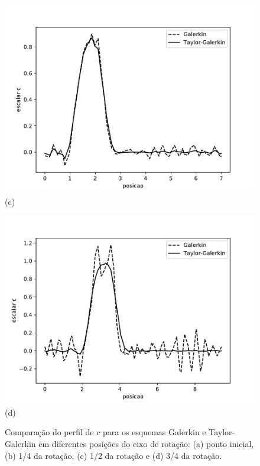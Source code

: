 \begin{center}
\begin{figure}[H]
\begin{minipage}{.5\linewidth}
      \centering
      \includegraphics[scale=0.53]{./02_chaps/cap_validation/figure/convection_600.pdf}\\
      (c)
     \end{minipage}%
     \begin{minipage}{.5\linewidth}
      \centering
      \includegraphics[scale=0.53]{./02_chaps/cap_validation/figure/convection_950.pdf}\\
      (d)
     \end{minipage}
     \medskip
     \caption{Comparação do perfil de $c$ para os esquemas Galerkin e Taylor-Galerkin em diferentes posições do eixo de rotação:
     (a) ponto inicial, 
     (b) 1/4 da rotação,
     (c) 1/2 da rotação e
     (d) 3/4 da rotação.}
     \label{perfil c}
\end{figure}
\end{center}

